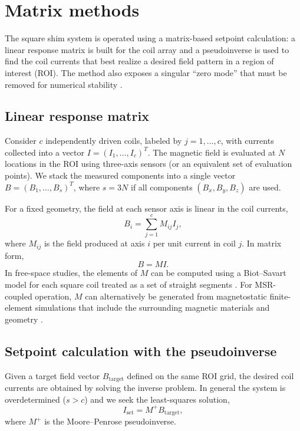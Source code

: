 \documentclass[preprint,12pt]{elsarticle}
\begin{document}
\section{Matrix methods}\label{sec:matrixmethods}

The square shim system is operated using a matrix-based setpoint calculation: a linear response matrix is built for the coil array and a pseudoinverse is used to find the coil currents that best realize a desired field pattern in a region of interest (ROI). The method also exposes a singular ``zero mode'' that must be removed for numerical stability \cite{bib:klassen2026squares}.

\subsection{Linear response matrix}

Consider $c$ independently driven coils, labeled by $j=1,\dots,c$, with currents collected into a vector $I=(I_1,\dots,I_c)^T$. The magnetic field is evaluated at $N$ locations in the ROI using three-axis sensors (or an equivalent set of evaluation points). We stack the measured components into a single vector $B=(B_1,\dots,B_s)^T$, where $s=3N$ if all components $(B_x,B_y,B_z)$ are used.

For a fixed geometry, the field at each sensor axis is linear in the coil currents,
\begin{equation}
  B_i=\sum_{j=1}^{c} M_{ij} I_j,
  \label{eq:Bij}
\end{equation}
where $M_{ij}$ is the field produced at axis $i$ per unit current in coil $j$. In matrix form,
\begin{equation}
  B=MI.
  \label{eq:forward_matrix}
\end{equation}
In free-space studies, the elements of $M$ can be computed using a Biot--Savart model for each square coil treated as a set of straight segments \cite{bib:klassen2026squares,bib:freespacecode}. For MSR-coupled operation, $M$ can alternatively be generated from magnetostatic finite-element simulations that include the surrounding magnetic materials and geometry \cite{bib:comsol}.

\subsection{Setpoint calculation with the pseudoinverse}

Given a target field vector $B_{\mathrm{target}}$ defined on the same ROI grid, the desired coil currents are obtained by solving the inverse problem. In general the system is overdetermined ($s>c$) and we seek the least-squares solution,
\begin{equation}
  I_{\mathrm{set}}=M^{+}B_{\mathrm{target}},
  \label{eq:setpoints}
\end{equation}
where $M^{+}$ is the Moore--Penrose pseudoinverse.
\end{document}
